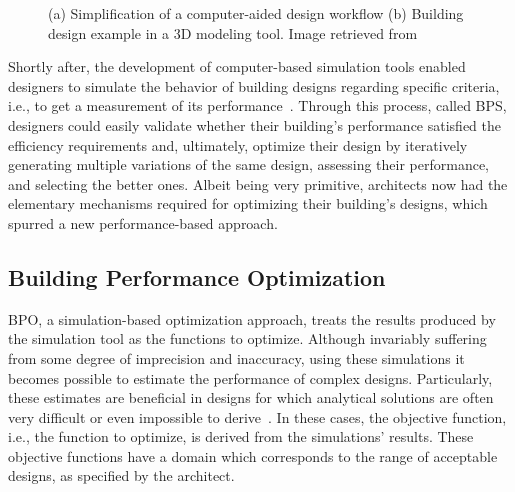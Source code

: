 \begin{figure}[htbp]
\centering
{}%
\hfill
{}%

\caption[General views of Traditional Design Approaches]{(a) Simplification of a computer-aided design workflow (b) Building design example in a 3D modeling tool. Image retrieved from~\cite{3DMODELTOOL}}
\label{fig:traditionaldesign}
\end{figure}

Shortly after, the development of computer-based simulation tools enabled designers to simulate the behavior of building designs regarding specific criteria, i.e., to get a measurement of its performance~\cite{Malkawi2005}. Through this process, called \ac{BPS}, designers could easily validate whether their building's performance satisfied the efficiency requirements and, ultimately, optimize their design by iteratively generating multiple variations of the same design, assessing their performance, and selecting the better ones. Albeit being very primitive, architects now had the elementary mechanisms required for optimizing their building's designs, which spurred a new performance-based approach.

\subsection{Building Performance Optimization}

	\ac{BPO}, a simulation-based optimization approach, treats the results produced by the simulation tool as the functions to optimize. Although invariably suffering from some degree of imprecision and inaccuracy, using these simulations it becomes possible to estimate the performance of complex designs. Particularly, these estimates are beneficial in designs for which analytical solutions are often very difficult or even impossible to derive~\cite{Kolda2003}. In these cases, the objective function, i.e., the function to optimize, is derived from the simulations' results. These objective functions have a domain which corresponds to the range of acceptable designs, as specified by the architect.

